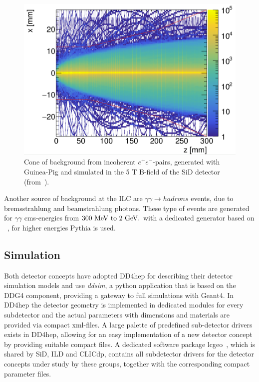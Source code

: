 \begin{figure}
\begin{center}
\includegraphics[width=0.90\hsize]{chapters/figures/pair_bg_cone_SiD.png}
\end{center}
\caption{Cone of background from incoherent $e^+e^-$-pairs, generated with Guinea-Pig and simulated in the 5 T B-field of the SiD
  detector (from~\cite{Schutz:2017ihd}).}
\label{fig:pair_bg}
\end{figure}

Another source of background at the ILC are $\gamma \gamma \rightarrow hadrons$ events, due to bremsstrahlung and beamstrahlung photons.
These type of events are generated for $\gamma \gamma$ cms-energies from $300~\rm{MeV~to} ~2~\rm{GeV}.$ with a dedicated generator based
on ~\cite{Chen:1993dba}, for higher energies Pythia is used.


\subsection{\label{sub:sw-sim}Simulation}

Both detector concepts have adopted DD4hep for describing their detector simulation models and use \emph{ddsim}, a python application that
is based on the DDG4 component, providing a gateway to full simulations with Geant4.
In DD4hep the detector geometry is implemented in dedicated \CPP modules for every subdetector and the actual parameters with dimensions
and materials are provided via compact xml-files. A large palette of predefined sub-detector drivers exists in DD4hep, allowing for an
easy implementation of a new detector concept by providing suitable compact files.
A dedicated software package lcgeo~\cite{bib:lcgeo}, which is shared by SiD, ILD and CLICdp, contains all subdetector drivers for the
detector concepts under study by these groups, together with the corresponding compact parameter files.

